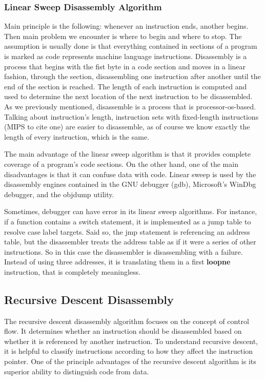 \subsubsection{Linear Sweep Disassembly Algorithm}

Main principle is the following: whenever an instruction ends, another begins. 
Then main problem we encounter is where to begin and where to stop. 
The assumption is usually done is that everything contained in sections of a program is marked as code represents machine language instructions. 
Disassembly is a process that begins with the fist byte in a code section and moves in a linear fashion, through the section, disassembling one instruction after another until the end of the section is reached. 
The length of each instruction is computed and used to determine the next location of the next instruction to be disassembled. As we previously mentioned, disassemble is a process that is processor-os-based. Talking about instruction's length, instruction sets with fixed-length instructions (MIPS to cite one) are easier to disassemble, as of course we know exactly the length of every instruction, which is the same. 
\par 
The main advantage of the linear sweep algorithm is that it provides complete coverage of a program's code sections. 
On the other hand, one of the main disadvantages is that it can confuse data with code. 
Linear sweep is used by the disassembly engines contained in the GNU debugger (gdb), Microsoft's WinDbg debugger, and the objdump utility. 
\par 
Sometimes, debugger can have error in its linear sweep algorithms. For instance, if a function contains a switch statement, it is implemented as a jump table to resolve case label targets. Said so, the jmp statement is referencing an address table, but the disassembler treats the address table as if it were a series of other instructions. So in this case the disassembler is disassembling with a failure. Instead of using three addresses, it is translating them in a first \textbf{loopne} instruction, that is completely meaningless. 

\subsection{Recursive Descent Disassembly} 

The recursive descent disassembly algorithm focuses on the concept of control flow.
It determines whether an instruction should be disassembled based on whether it is referenced by another instruction.
To understand recursive descent, it is helpful to classify instructions
according to how they affect the instruction pointer.
One of the principle advantages of the recursive descent algorithm is its
superior ability to distinguish code from data.

